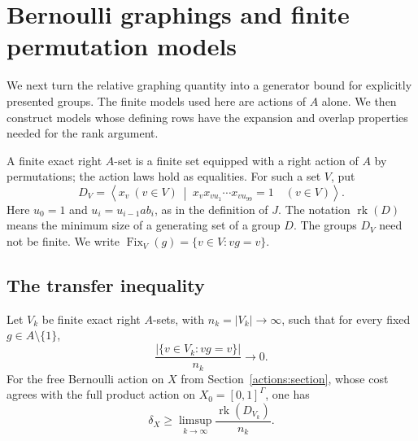 \section{Bernoulli graphings and finite permutation models}
\label{models:section}

We next turn the relative graphing quantity into a generator bound for
explicitly presented groups. The finite models used here are actions of
$A$ alone. We then construct models whose defining rows have the
expansion and overlap properties needed for the rank argument.

A finite exact right $A$-set is a finite set equipped with a right
action of $A$ by permutations; the action laws hold as equalities.
For such a set $V$, put
\begin{equation}
 D_V=\left\langle x_v\ (v\in V)\ \middle|\
 x_vx_{vu_1}\cdots x_{vu_{99}}=1\quad(v\in V)\right\rangle.
 \label{models:presentation}
\end{equation}
Here $u_0=1$ and $u_i=u_{i-1}ab_i$, as in the definition of $J$.
The notation $\operatorname{rk}(D)$ means the minimum size of a
generating set of a group $D$. The groups $D_V$ need not be finite.
We write $\operatorname{Fix}_V(g)=\{v\in V:vg=v\}$.

\subsection{The transfer inequality}

\begin{proposition}\label{models:transfer}
Let $V_k$ be finite exact right $A$-sets, with $n_k=|V_k|\to\infty$,
such that for every fixed $g\in A\setminus\{1\}$,
\begin{equation}
 \frac{|\{v\in V_k:vg=v\}|}{n_k}\longrightarrow0.
 \label{models:fixed-points}
\end{equation}
For the free Bernoulli action on $X$ from
Section~\ref{actions:section}, whose cost agrees with the full product
action on $X_0=[0,1]^\Gamma$, one has
\[
 \delta_X\ge\limsup_{k\to\infty}
 \frac{\operatorname{rk}(D_{V_k})}{n_k}.
\]
\end{proposition}

